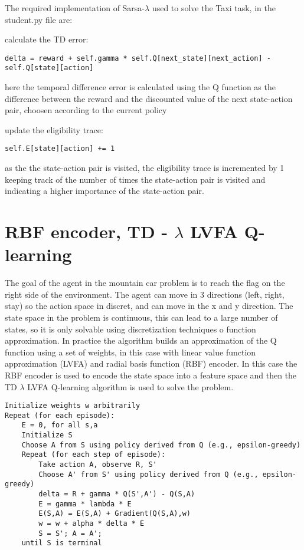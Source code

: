 \documentclass{article}
\begin{document}
The required implementation of Sarsa-$\lambda$ used to solve the Taxi task, in the student.py file are:

calculate the TD error:
\begin{verbatim}
delta = reward + self.gamma * self.Q[next_state][next_action] - self.Q[state][action]
\end{verbatim}

here the temporal difference error is calculated using the Q function as the difference between
the reward and the discounted value of the next state-action pair,
choosen according to the current policy

update the eligibility trace:
\begin{verbatim}
self.E[state][action] += 1
\end{verbatim}

as the the state-action pair is visited, the eligibility trace is incremented by 1
keeping track of the number of times the state-action pair is visited
and indicating a higher importance of the state-action pair.


\section{RBF encoder, TD - $\lambda$ LVFA Q-learning}

The goal of the agent in the mountain car problem is to reach the flag on the right side of the environment.
The agent can move in 3 directions (left, right, stay) so the action space in discret,
and can move in the x and y direction.
The state space in the problem is continuous, this can lead to a large number of states,
so it is only solvable using discretization techniques o function approximation.
In practice the algorithm builds an approximation of the Q function using a set of weights,
in this case with linear value function approximation (LVFA) and radial basis function (RBF) encoder.
In this case the RBF encoder is used to encode the state space into a feature space and 
then the TD  $\lambda$ LVFA Q-learning algorithm is used to solve the problem.


\begin{verbatim}
Initialize weights w arbitrarily
Repeat (for each episode):
    E = 0, for all s,a
    Initialize S
    Choose A from S using policy derived from Q (e.g., epsilon-greedy)
    Repeat (for each step of episode):
        Take action A, observe R, S'
        Choose A' from S' using policy derived from Q (e.g., epsilon-greedy)
        delta = R + gamma * Q(S',A') - Q(S,A)
        E = gamma * lambda * E
        E(S,A) = E(S,A) + Gradient(Q(S,A),w)
        w = w + alpha * delta * E
        S = S'; A = A';
    until S is terminal
\end{verbatim}
\end{document}
